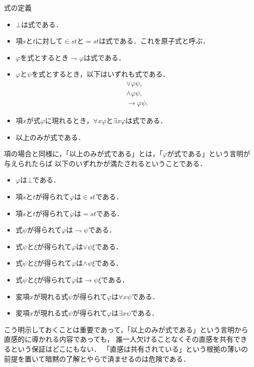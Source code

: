\documentclass[a4j,10.5pt,oneside,openany]{jsbook}
\theoremstyle{mystyle}
\begin{document}
	\begin{itembox}[l]{式の定義}
		\begin{itemize}
			\item $\bot$は式である．
			\item 項$s$と$t$に対して$\in st$と$=st$は式である．これを原子式と呼ぶ．
			\item $\varphi$を式とするとき$\rightharpoondown \varphi$は式である．
			\item $\varphi$と$\psi$を式とするとき，以下はいずれも式である．
				\begin{align}
					&\vee \varphi \psi, \\
					&\wedge \varphi \psi, \\
					&\rightarrow \varphi \psi.
				\end{align}
			
			\item 項$x$が式$\varphi$に現れるとき，$\forall x \varphi$と$\exists x \varphi$は式である．
			
			\item 以上のみが式である．
		\end{itemize}
	\end{itembox}
	
	項の場合と同様に，「以上のみが式である」とは，「$\varphi$が式である」という言明が与えられたらば
	以下のいずれかが満たされるということである．
	\begin{itemize}
		\item $\varphi$は$\bot$である．
		\item 項$s$と$t$が得られて$\varphi$は$\in s t$である．
		\item 項$s$と$t$が得られて$\varphi$は$= s t$である．
		\item 式$\psi$が得られて$\varphi$は$\rightharpoondown \psi$である．
		\item 式$\psi$と$\xi$が得られて$\varphi$は$\vee \psi \xi$である．
		\item 式$\psi$と$\xi$が得られて$\varphi$は$\wedge \psi \xi$である．
		\item 式$\psi$と$\xi$が得られて$\varphi$は$\rightarrow \psi \xi$である．
		\item 変項$x$が現れる式$\psi$が得られて$\varphi$は$\forall x \psi$である．
		\item 変項$x$が現れる式$\psi$が得られて$\varphi$は$\exists x \psi$である．
	\end{itemize}
	
	こう明示しておくことは重要であって，「以上のみが式である」という言明から直感的に導かれる内容であっても，
	誰一人欠けることなくその直感を共有できるという保証はどこにもない．
	「直感は共有されている」という根拠の薄いの前提を置いて暗黙の了解とやらで済ませるのは危険である．
	
\end{document}
